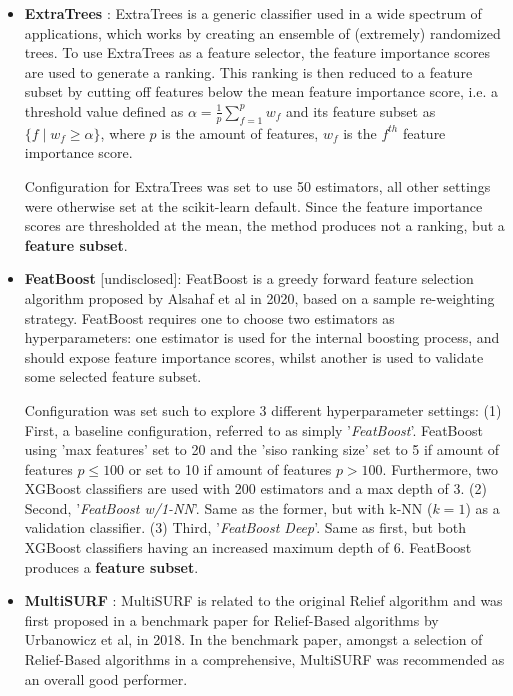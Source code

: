 \documentclass{article}
\begin{document}
\begin{itemize}
    \item \textbf{ExtraTrees} \citep{geurts2006extremely}: ExtraTrees is a generic classifier used in a wide spectrum of applications, which works by creating an ensemble of (extremely) randomized trees. To use ExtraTrees as a feature selector, the feature importance scores are used to generate a ranking. This ranking is then reduced to a feature subset by cutting off features below the mean feature importance score, i.e. a threshold value defined as $\alpha = \frac{1}{p}\sum^{p}_{f=1}w_f$ and its feature subset as $\{f  \mid  w_f \geq \alpha\}$, where $p$ is the amount of features, $w_f$ is the $f^{th}$ feature importance score. 
    
    Configuration for ExtraTrees was set to use 50 estimators, all other settings were otherwise set at the scikit-learn \citep{pedregosa2011scikit} default. Since the feature importance scores are thresholded at the mean, the method produces not a ranking, but a \textbf{feature subset}.
    
    \item \textbf{FeatBoost} [undisclosed]: FeatBoost is a greedy forward feature selection algorithm proposed by Alsahaf et al in 2020, based on a sample re-weighting strategy. FeatBoost requires one to choose two estimators as hyperparameters: one estimator is used for the internal boosting process, and should expose feature importance scores, whilst another is used to validate some selected feature subset.
    
    Configuration was set such to explore 3 different hyperparameter settings: (1) First, a baseline configuration, referred to as simply '\textit{FeatBoost}'. FeatBoost using 'max features' set to 20 and the 'siso ranking size' set to 5 if amount of features $p \leq 100$ or set to 10 if amount of features $p > 100$. Furthermore, two XGBoost classifiers are used with 200 estimators and a max depth of 3. (2) Second, '\textit{FeatBoost w/1-NN}'. Same as the former, but with k-NN ($k = 1$) as a validation classifier. (3) Third, '\textit{FeatBoost Deep}'. Same as first, but both XGBoost classifiers having an increased maximum depth of 6. FeatBoost produces a \textbf{feature subset}.
    
    \item \textbf{MultiSURF} \citep{urbanowicz2018benchmarking} \citep{urbanowicz2018relief}: MultiSURF is related to the original Relief algorithm \citep{kira1992feature} and was first proposed in a benchmark paper for Relief-Based algorithms by Urbanowicz et al, in 2018. In the benchmark paper, amongst a selection of Relief-Based algorithms in a comprehensive, MultiSURF was recommended as an overall good performer.
    

\end{itemize}
\end{document}
